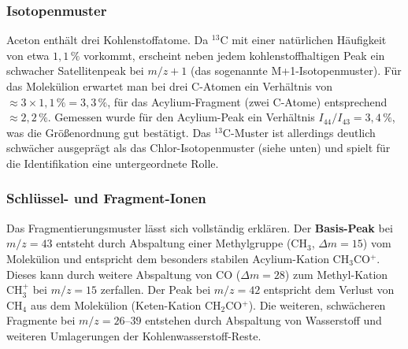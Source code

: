 \documentclass{article}
\begin{document}
\subsubsection*{Isotopenmuster}

Aceton enthält drei Kohlenstoffatome. Da $^{13}$C mit einer natürlichen
Häufigkeit von etwa $1{,}1\,\%$ vorkommt, erscheint neben jedem
kohlenstoffhaltigen Peak ein schwacher Satellitenpeak bei $m/z + 1$
(das sogenannte M+1-Isotopenmuster).
Für das Molekülion erwartet man bei drei C-Atomen ein Verhältnis von
$\approx 3 \times 1{,}1\,\% = 3{,}3\,\%$, für das Acylium-Fragment
(zwei C-Atome) entsprechend $\approx 2{,}2\,\%$.
Gemessen wurde für den Acylium-Peak ein Verhältnis
$I_{44}/I_{43} = 3{,}4\,\%$, was die Größenordnung gut bestätigt.
Das $^{13}$C-Muster ist allerdings deutlich schwächer ausgeprägt als
das Chlor-Isotopenmuster (siehe unten) und spielt für die
Identifikation eine untergeordnete Rolle.

\subsubsection*{Schlüssel- und Fragment-Ionen}

Das Fragmentierungsmuster lässt sich vollständig erklären.
Der \textbf{Basis-Peak} bei $m/z = 43$ entsteht durch Abspaltung einer
Methylgruppe (CH$_3$, $\Delta m = 15$) vom Molekülion und entspricht
dem besonders stabilen Acylium-Kation CH$_3$CO$^+$.
Dieses kann durch weitere Abspaltung von CO ($\Delta m = 28$) zum
Methyl-Kation CH$_3^+$ bei $m/z = 15$ zerfallen.
Der Peak bei $m/z = 42$ entspricht dem Verlust von CH$_4$ aus dem
Molekülion (Keten-Kation CH$_2$CO$^+$).
Die weiteren, schwächeren Fragmente bei $m/z = 26$--$39$ entstehen
durch Abspaltung von Wasserstoff und weiteren Umlagerungen der
Kohlenwasserstoff-Reste.
\end{document}
